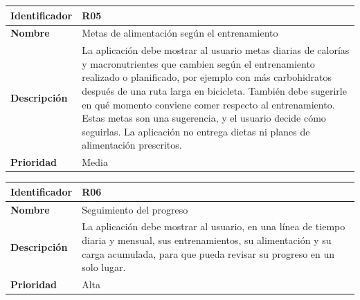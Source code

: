 \begin{table}[h!]
    \centering
    \renewcommand{\arraystretch}{1.3}
    \begin{tabular}{|p{3.5cm}|p{11.5cm}|}
        \hline
        \rowcolor[HTML]{EFEFEF} 
        \textbf{Identificador} & \textbf{R05} \\ \hline
        \textbf{Nombre} & Metas de alimentación según el entrenamiento \\ \hline
        \textbf{Descripción} & La aplicación debe mostrar al usuario metas diarias de calorías y macronutrientes que cambien según el entrenamiento realizado o planificado, por ejemplo con más carbohidratos después de una ruta larga en bicicleta. También debe sugerirle en qué momento conviene comer respecto al entrenamiento. Estas metas son una sugerencia, y el usuario decide cómo seguirlas. La aplicación no entrega dietas ni planes de alimentación prescritos. \\ \hline
        \textbf{Prioridad} & Media \\ \hline
    \end{tabular}
\end{table}

\begin{table}[h!]
    \centering
    \renewcommand{\arraystretch}{1.3}
    \begin{tabular}{|p{3.5cm}|p{11.5cm}|}
        \hline
        \rowcolor[HTML]{EFEFEF} 
        \textbf{Identificador} & \textbf{R06} \\ \hline
        \textbf{Nombre} & Seguimiento del progreso \\ \hline
        \textbf{Descripción} & La aplicación debe mostrar al usuario, en una línea de tiempo diaria y mensual, sus entrenamientos, su alimentación y su carga acumulada, para que pueda revisar su progreso en un solo lugar. \\ \hline
        \textbf{Prioridad} & Alta \\ \hline
    \end{tabular}
\end{table}

